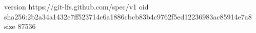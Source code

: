 version https://git-lfs.github.com/spec/v1
oid sha256:2b2a34a1432c7ff523714c6a1886cbcb83b4c9762f5ed12236983ac85914e7a8
size 87536
